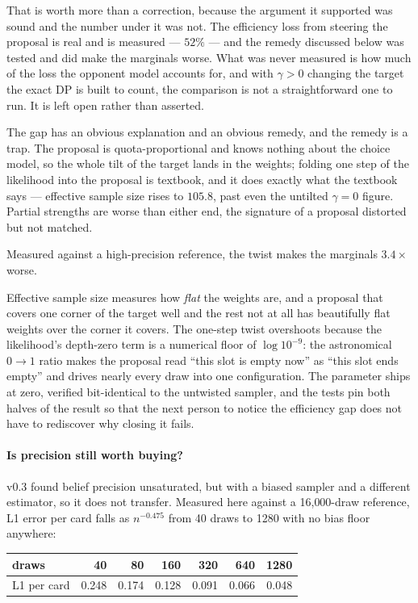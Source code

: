 \documentclass[11pt,a4paper]{article}
\begin{document}
That is worth more than a correction, because the argument it supported was
sound and the number under it was not. The efficiency loss from steering the
proposal is real and is measured --- $52\%$ --- and the remedy discussed below
was tested and did make the marginals worse. What was never measured is how
much of the loss the opponent model accounts for, and with $\gamma > 0$ changing
the target the exact DP is built to count, the comparison is not a
straightforward one to run. It is left open rather than asserted.

The gap has an obvious explanation and an obvious remedy, and the remedy is a
trap. The proposal is quota-proportional and knows nothing about the choice
model, so the whole tilt of the target lands in the weights; folding one step of
the likelihood into the proposal is textbook, and it does exactly what the
textbook says --- effective sample size rises to $105.8$, past even the untilted
$\gamma = 0$ figure. Partial strengths are worse than either end, the signature
of a proposal distorted but not matched.

Measured against a high-precision reference, the twist makes the marginals
$3.4\times$ worse.

Effective sample size measures how \emph{flat} the weights are, and a proposal
that covers one corner of the target well and the rest not at all has beautifully
flat weights over the corner it covers. The one-step twist overshoots because the
likelihood's depth-zero term is a numerical floor of $\log 10^{-9}$: the
astronomical $0 \to 1$ ratio makes the proposal read ``this slot is empty now''
as ``this slot ends empty'' and drives nearly every draw into one configuration.
The parameter ships at zero, verified bit-identical to the untwisted sampler, and
the tests pin both halves of the result so that the next person to notice the
efficiency gap does not have to rediscover why closing it fails.

\paragraph{Is precision still worth buying?} v0.3 found belief precision
unsaturated, but with a biased sampler and a different estimator, so it does not
transfer. Measured here against a 16{,}000-draw reference, L1 error per card falls
as $n^{-0.475}$ from 40 draws to 1280 with no bias floor anywhere:

\begin{center}
\small
\begin{tabular}{lrrrrrr}
\toprule
draws & 40 & 80 & 160 & 320 & 640 & 1280 \\
\midrule
L1 per card & 0.248 & 0.174 & 0.128 & 0.091 & 0.066 & 0.048 \\
\bottomrule
\end{tabular}
\end{center}
\end{document}

